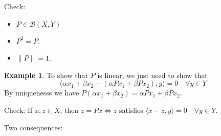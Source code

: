 \documentclass{article}
\theoremstyle{definition}
\newtheorem{ex}{Example}
\begin{document}
Check:
\begin{itemize}
	\item $P \in \mathcal{B}(X, Y)$

	\item $P^2 = P$.

	\item $\|P\| = 1$.
\end{itemize}

\begin{ex}
	To show that $P$ is linear, we just need to show that
	\[
		\langle \alpha x_1 + \beta x_2 - (\alpha P x_1 + \beta P x_2), y \rangle = 0 \quad \forall y \in Y
	\]
	By uniquenesss we have $P(\alpha x_1 + \beta x_2) = \alpha P x_1 + \beta P x_2$.
\end{ex}

Check: If $x, z \in X$, then $z = Px \Leftrightarrow z$ satisfies $\langle x - z, y \rangle = 0 \quad \forall y \in Y$.

\par Two consequences:
\end{document}
